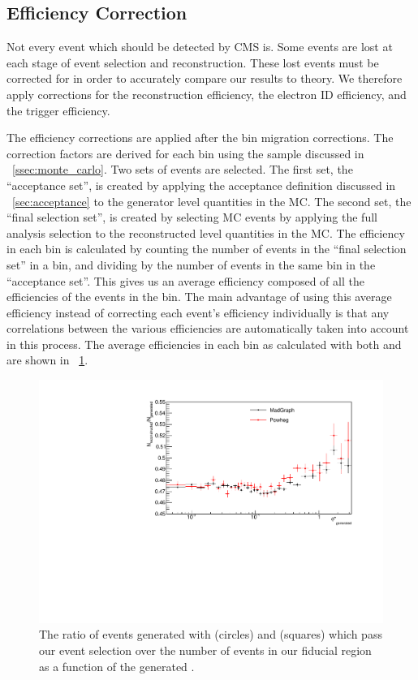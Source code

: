 \subsection{Efficiency Correction}
\label{ssec:eff_correction}

Not every event which should be detected by CMS is. Some events are lost at
each stage of event selection and reconstruction. These lost events must be
corrected for in order to accurately compare our results to theory. We
therefore apply corrections for the reconstruction efficiency, the electron ID
efficiency, and the trigger efficiency.

The efficiency corrections are applied after the bin migration corrections. The
correction factors are derived for each \phistar bin using the \Ztoee \MADGRAPH
sample discussed in \SEC~\ref{ssec:monte_carlo}. Two sets of events are
selected. The first set, the ``acceptance set'', is created by applying the
acceptance definition discussed in \SEC~\ref{sec:acceptance} to the generator
level quantities in the MC. The second set, the ``final selection set'', is
created by selecting MC events by applying the full analysis selection to the
reconstructed level quantities in the MC. The efficiency in each \phistar bin
is calculated by counting the number of events in the ``final selection set''
in a bin, and dividing by the number of events in the same bin in the
``acceptance set''. This gives us an average efficiency composed of all the
efficiencies of the events in the bin. The main advantage of using this average
efficiency instead of correcting each event's efficiency individually is that
any correlations between the various efficiencies are automatically taken into
account in this process. The average efficiencies in each bin as calculated with
both \MADGRAPH and \POWHEG are shown in \FIG~\ref{fig:average_efficiencies}.

\begin{figure}[!htbp]
    \centering
    \includegraphics[width=\textwidth]{figures/EventEff.pdf}
    \caption{
        The ratio of \Ztoee events generated with \MADGRAPH (circles) and
        \POWHEG (squares) which pass our event selection over the number of
        events in our fiducial region as a function of the generated \phistar.
    }
    \label{fig:average_efficiencies}
\end{figure}
